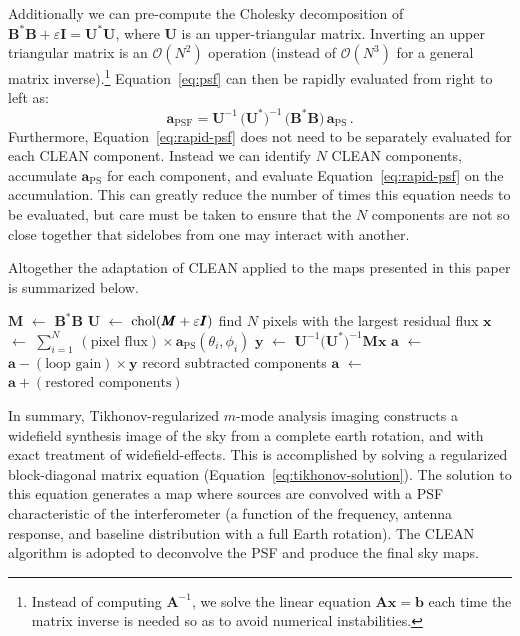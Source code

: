 \documentclass[twocolumn]{aastex61}
\newcommand*\Let[2]{\State #1 $\gets$ #2}
\newcommand{\todo}[1]{\textcolor{red}{TODO: #1}\PackageWarning{TODO:}{#1!}}
\renewcommand{\b}{\pmb}
\begin{document}
Additionally we can pre-compute the Cholesky decomposition of $\b B^*\b B + \varepsilon\b I = \b
U^*\b U$, where $\b U$ is an upper-triangular matrix. Inverting an upper triangular matrix is an
$\mathcal{O}(N^2)$ operation (instead of $\mathcal{O}(N^3)$ for a general matrix inverse).\footnote{
    Instead of computing $\b A^{-1}$, we solve the linear equation $\b A\b x = \b b$ each time the
    matrix inverse is needed so as to avoid numerical instabilities.
}
Equation~\ref{eq:psf} can then be rapidly evaluated from right to left as:
\begin{equation}\label{eq:rapid-psf}
    \b a_\text{PSF} =
        \b U^{-1}\,\big(\b U^*\big)^{-1}\,\big(\b B^*\b B\big)\,\b a_\text{PS}\,.
\end{equation}
Furthermore, Equation~\ref{eq:rapid-psf} does not need to be separately evaluated for each CLEAN
component. Instead we can identify $N$ CLEAN components, accumulate $\b a_\text{PS}$ for each
component, and evaluate Equation~\ref{eq:rapid-psf} on the accumulation. This can greatly reduce the
number of times this equation needs to be evaluated, but care must be taken to ensure that the $N$
components are not so close together that sidelobes from one may interact with another.


Altogether the adaptation of CLEAN applied to the maps presented in this paper is summarized below.
\begin{algorithmic}[1]
    \Require{$\b a$ is the solution to Equation~\ref{eq:tikhonov-solution}}
    \Function{CLEAN}{$\b a$}
    \Let{$\b M$}{$\b B^*\b B$}
    \Let{$\b U$}{${\rm chol}(\b M + \varepsilon\b I)$} 
    \State find $N$ pixels with the largest residual flux
    \Let{$\b x$}{$\sum_{i=1}^N \,(\text{pixel flux}) \times \b a_\text{PS}(\theta_i, \phi_i)$}
    \Let{$\b y$}{$\b U^{-1}\big(\b U^*\big)^{-1}\b M\b x$}
    \Let{$\b a$}{$\b a - (\text{loop gain})\times\b y$}
    \State record subtracted components
    \EndWhile
    \Let{$\b a$}{$\b a + (\text{restored components})$}
    \State \Return{$\b a$}
    \EndFunction
\end{algorithmic}

In summary, Tikhonov-regularized $m$-mode analysis imaging constructs a widefield synthesis image of
the sky from a complete earth rotation, and  with exact treatment of widefield-effects. This is
accomplished by solving a regularized block-diagonal matrix equation
(Equation~\ref{eq:tikhonov-solution}). The solution to this equation generates a map where
sources are convolved with a PSF characteristic of the interferometer (a function of the frequency,
antenna response, and baseline distribution with a full Earth rotation). The CLEAN algorithm is
adopted to deconvolve the PSF and produce the final sky maps.
\end{document}

